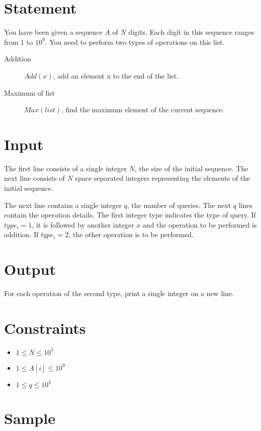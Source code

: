 \documentclass{article}
\begin{document}
\section*{Statement}

You have been given a sequence $A$ of $N$ digits. Each digit in this sequence ranges from $1$ to $10^{9}$. You need to perform two types of operations on this list.

\begin{description}
    \item[Addition] $Add(x)$, add an element x to the end of the list.
    \item[Maximum of list] $Max(list)$, find the maximum element of the current sequence.
\end{description}

\section*{Input}

The first line consists of a single integer $N$, the size of the initial sequence. The next line consists of $N$ space separated integers representing the elements of the initial sequence.

The next line contains a single integer $q$, the number of queries. The next $q$ lines contain the operation details. The first integer type indicates the type of query. If $type_{i} = 1$, it is followed by another integer $x$ and the operation to be performed is addition. If $type_{i} = 2$, the other operation is to be performed.

\section*{Output}

For each operation of the second type, print a single integer on a new line. 

\section*{Constraints}

\begin{itemize}
    \item $1 \le N \le 10^{5}$
    \item $1 \le A[i] \le 10^{9}$
    \item $1 \le q \le 10^{4}$
\end{itemize}

\section*{Sample}
\end{document}
